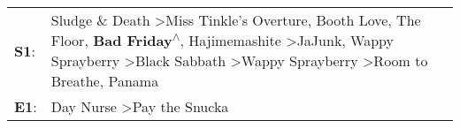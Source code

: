 \begin{supertabular}{p{0.03\textwidth}p{0.92\textwidth}}
 \textbf{S1}:  &  Sludge \& Death\textsuperscript{} \textgreater \enspace Miss Tinkle's Overture\textsuperscript{}, \enspace Booth Love\textsuperscript{}, \enspace The Floor\textsuperscript{}, \enspace \textbf{Bad Friday\textsuperscript{$\wedge$}}, \enspace Hajimemashite\textsuperscript{} \textgreater \enspace JaJunk\textsuperscript{}, \enspace Wappy Sprayberry\textsuperscript{} \textgreater \enspace Black Sabbath\textsuperscript{} \textgreater \enspace Wappy Sprayberry\textsuperscript{} \textgreater \enspace Room to Breathe\textsuperscript{}, \enspace Panama\textsuperscript{}  \enspace  \\
 \textbf{E1}:  &                                                                                                                                                                                                                                                                                                                                                                                                                                                                                                     Day Nurse\textsuperscript{} \textgreater \enspace Pay the Snucka\textsuperscript{}  \enspace  \\
\end{supertabular}
